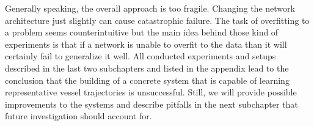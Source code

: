 Generally speaking, the overall approach is too fragile. Changing the network architecture just slightly can cause catastrophic failure. The task of overfitting to a problem seems counterintuitive but the main idea behind those kind of experiments is that if a network is unable to overfit to the data than it will certainly fail to generalize it well. All conducted experiments and setups described in the last two subchapters and listed in the appendix lead to the conclusion that the building of a concrete system that is capable of learning representative vessel trajectories is unsuccessful. Still, we will provide possible improvements to the systems and describe pitfalls in the next subchapter that future investigation should account for.